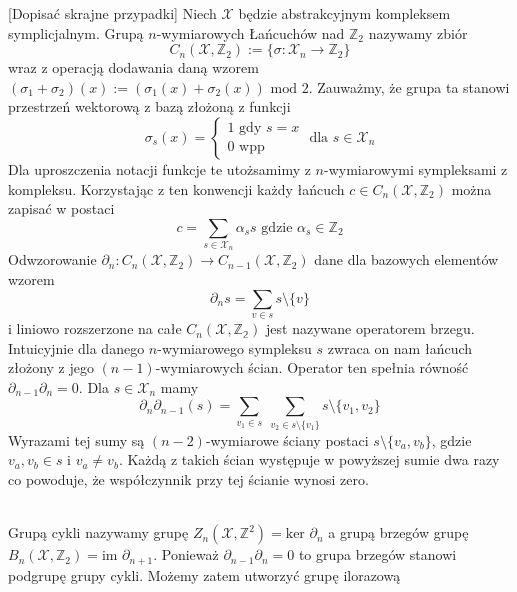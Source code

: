 \documentclass[12pt,a4paper]{article}
\newcommand{\fun}[3]{#1:#2 \rightarrow #3}
\begin{document}
[Dopisać skrajne przypadki]
Niech $\mathcal{X}$ będzie abstrakcyjnym kompleksem symplicjalnym. Grupą $n$-wymiarowych Łańcuchów nad $\mathbb{Z}_2$ nazywamy zbiór
$$C_n(\mathcal{X},\mathbb{Z}_2):=\{\fun{\sigma}{\mathcal{X}_n}{\mathbb{Z}_2 }\}$$
wraz z operacją dodawania daną wzorem $(\sigma_1+\sigma_2)(x):=(\sigma_1(x)+\sigma_2(x))\text{ mod } 2$.
Zauważmy, że grupa ta stanowi przestrzeń wektorową z bazą złożoną z funkcji
$$
\sigma_s(x)=
\begin{cases} 
1\text{ gdy }s=x
\\0\text{ wpp}
\end{cases}
\text{ dla } s\in\mathcal{X}_n
$$ 
Dla uproszczenia notacji funkcje te utożsamimy z  $n$-wymiarowymi sympleksami z kompleksu. Korzystając z ten konwencji każdy łańcuch $c\in C_n(\mathcal{X},\mathbb{Z}_2)$ można zapisać w postaci
$$c=\sum_{s\in\mathcal{X}_n}\alpha_s s  \text{ gdzie }\alpha_s\in \mathbb{Z}_2$$
Odwzorowanie $\fun{\partial_n}{C_n(\mathcal{X},\mathbb{Z}_2)}{C_{n-1}(\mathcal{X},\mathbb{Z}_2)}$ dane dla bazowych elementów wzorem
$$\partial_n s = \sum_{v\in s}s\setminus \{v\}$$
i liniowo rozszerzone na całe $C_n(\mathcal{X},\mathbb{Z_2})$ jest nazywane operatorem brzegu. Intuicyjnie dla danego $n$-wymiarowego sympleksu $s$ zwraca on nam łańcuch złożony z jego $(n-1)$-wymiarowych ścian.
Operator ten spełnia równość $\partial_{n-1}\partial_{n}=0$. Dla $s\in\mathcal{X}_n$ mamy
$$\partial_n\partial_{n-1}(s)=\sum_{v_1\in s}\;\sum_{v_2\in s\setminus \{v_1\}}s\setminus\{v_1,v_2\} $$
Wyrazami tej sumy są $(n-2)$-wymiarowe ściany postaci $s\setminus\{v_a,v_b\}$, gdzie $v_a,v_b\in s$ i $v_a\not =v_b$. Każdą z takich ścian występuje w powyższej sumie dwa razy co powoduje, że współczynnik przy tej ścianie wynosi zero.

\\Grupą cykli nazywamy grupę $Z_n(\mathcal{X},\mathbb{Z}^2)= \text{ker }\partial_n$ a grupą brzegów grupę $B_n(\mathcal{X},\mathbb{Z}_2) = \text{im } \partial_{n+1}$. Ponieważ $\partial_{n-1}\partial_n = 0$ to grupa brzegów stanowi podgrupę grupy cykli. Możemy zatem utworzyć grupę ilorazową 
\end{document}
